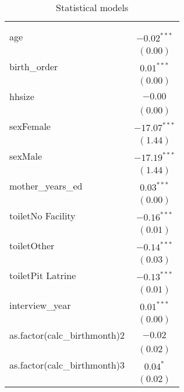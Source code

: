 
\begin{longtable}{l c }
\hline
 &  \\
\hline
\endfirsthead
\hline
 &  \\
\hline
\endhead
\hline
\endfoot
\hline
\multicolumn{2}{l}{\scriptsize{$^{***}p<0.001$, $^{**}p<0.01$, $^*p<0.05$}}\\
\caption{Statistical models}
\label{table:coefficients}
\endlastfoot
age                              & $-0.02^{***}$  \\
                                 & $(0.00)$       \\
birth\_order                     & $0.01^{***}$   \\
                                 & $(0.00)$       \\
hhsize                           & $-0.00$        \\
                                 & $(0.00)$       \\
sexFemale                        & $-17.07^{***}$ \\
                                 & $(1.44)$       \\
sexMale                          & $-17.19^{***}$ \\
                                 & $(1.44)$       \\
mother\_years\_ed                & $0.03^{***}$   \\
                                 & $(0.00)$       \\
toiletNo Facility                & $-0.16^{***}$  \\
                                 & $(0.01)$       \\
toiletOther                      & $-0.14^{***}$  \\
                                 & $(0.03)$       \\
toiletPit Latrine                & $-0.13^{***}$  \\
                                 & $(0.01)$       \\
interview\_year                  & $0.01^{***}$   \\
                                 & $(0.00)$       \\
as.factor(calc\_birthmonth)2     & $-0.02$        \\
                                 & $(0.02)$       \\
as.factor(calc\_birthmonth)3     & $0.04^{*}$     \\
                                 & $(0.02)$       \\

\end{longtable}
